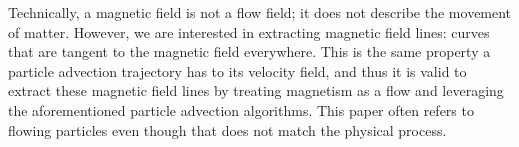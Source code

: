 Technically, a magnetic field is not a flow field; it does not describe the movement of matter.
However, we are interested in extracting magnetic field lines: curves that are tangent to the magnetic field everywhere.
This is the same property a particle advection trajectory has to its velocity field, and thus it is valid to extract these magnetic field lines by treating magnetism as a flow and leveraging the aforementioned particle advection algorithms.
This paper often refers to flowing particles even though that does not match the physical process.